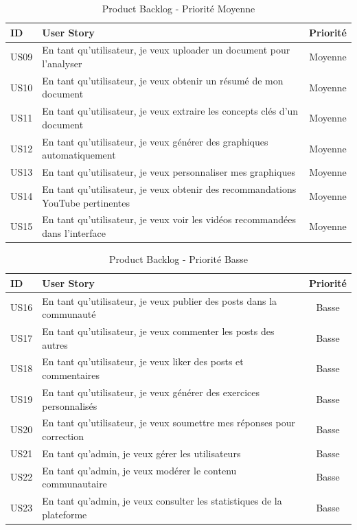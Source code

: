 \begin{table}[H]
\centering
\caption{Product Backlog - Priorité Moyenne}
\label{tab:backlog-moyenne}
\begin{tabular}{|l|p{8cm}|c|}
\hline
\textbf{ID} & \textbf{User Story} & \textbf{Priorité} \\
\hline
US09 & En tant qu'utilisateur, je veux uploader un document pour l'analyser & Moyenne \\
\hline
US10 & En tant qu'utilisateur, je veux obtenir un résumé de mon document & Moyenne \\
\hline
US11 & En tant qu'utilisateur, je veux extraire les concepts clés d'un document & Moyenne \\
\hline
US12 & En tant qu'utilisateur, je veux générer des graphiques automatiquement & Moyenne \\
\hline
US13 & En tant qu'utilisateur, je veux personnaliser mes graphiques & Moyenne \\
\hline
US14 & En tant qu'utilisateur, je veux obtenir des recommandations YouTube pertinentes & Moyenne \\
\hline
US15 & En tant qu'utilisateur, je veux voir les vidéos recommandées dans l'interface & Moyenne \\
\hline
\end{tabular}
\end{table}

\begin{table}[H]
\centering
\caption{Product Backlog - Priorité Basse}
\label{tab:backlog-basse}
\begin{tabular}{|l|p{8cm}|c|}
\hline
\textbf{ID} & \textbf{User Story} & \textbf{Priorité} \\
\hline
US16 & En tant qu'utilisateur, je veux publier des posts dans la communauté & Basse \\
\hline
US17 & En tant qu'utilisateur, je veux commenter les posts des autres & Basse \\
\hline
US18 & En tant qu'utilisateur, je veux liker des posts et commentaires & Basse \\
\hline
US19 & En tant qu'utilisateur, je veux générer des exercices personnalisés & Basse \\
\hline
US20 & En tant qu'utilisateur, je veux soumettre mes réponses pour correction & Basse \\
\hline
US21 & En tant qu'admin, je veux gérer les utilisateurs & Basse \\
\hline
US22 & En tant qu'admin, je veux modérer le contenu communautaire & Basse \\
\hline
US23 & En tant qu'admin, je veux consulter les statistiques de la plateforme & Basse \\
\hline
\end{tabular}
\end{table}

